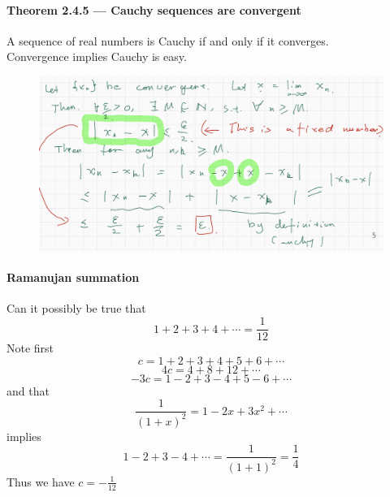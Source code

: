\documentclass{article}
\begin{document}
\paragraph{Theorem 2.4.5 — Cauchy sequences are convergent}
A sequence of real numbers is Cauchy if and only if it converges.\\
Convergence implies Cauchy is easy.
\begin{figure}[H]
    \centering
    \includegraphics{0134}
\end{figure}
\paragraph{Ramanujan summation}
Can it possibly be true that 
$$1+2+3+4+\cdots=\frac{1}{12}$$
Note first
$$c = 1 + 2 + 3 + 4 + 5 + 6 + \cdots$$
$$4c =4 + 8 + 12 +\cdots $$
$$-3c=1-2+3-4+5-6+\cdots$$
and that 
$$\frac{1}{(1+x)^2}=1-2x+3x^2+\cdots$$
implies
$$1-2+3-4+\cdots=\frac{1}{(1+1)^2}=\frac{1}{4}$$
Thus we have $c=-\frac{1}{12}$
\end{document}
